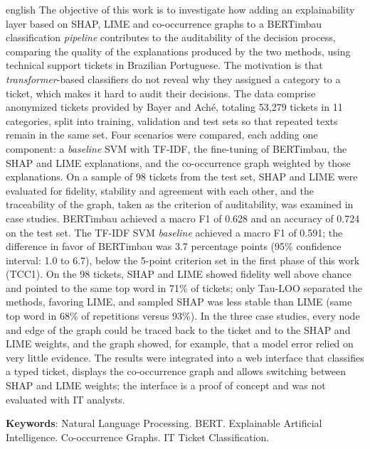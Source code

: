 \documentclass[
    12pt,                %
    openright,           %
    oneside,             %
    a4paper,             %
    english,             %
    brazil               %
]{abntex2}
\begin{document}
\begin{resumo}[Abstract]
\begin{otherlanguage*}{english}
The objective of this work is to investigate how adding an explainability layer based on SHAP, LIME and co-occurrence graphs to a BERTimbau classification \textit{pipeline} contributes to the auditability of the decision process, comparing the quality of the explanations produced by the two methods, using technical support tickets in Brazilian Portuguese. The motivation is that \textit{transformer}-based classifiers do not reveal why they assigned a category to a ticket, which makes it hard to audit their decisions. The data comprise anonymized tickets provided by Bayer and Aché, totaling 53,279 tickets in 11 categories, split into training, validation and test sets so that repeated texts remain in the same set. Four scenarios were compared, each adding one component: a \textit{baseline} SVM with TF-IDF, the fine-tuning of BERTimbau, the SHAP and LIME explanations, and the co-occurrence graph weighted by those explanations. On a sample of 98 tickets from the test set, SHAP and LIME were evaluated for fidelity, stability and agreement with each other, and the traceability of the graph, taken as the criterion of auditability, was examined in case studies. BERTimbau achieved a macro F1 of 0.628 and an accuracy of 0.724 on the test set. The TF-IDF SVM \textit{baseline} achieved a macro F1 of 0.591; the difference in favor of BERTimbau was 3.7 percentage points (95\% confidence interval: 1.0 to 6.7), below the 5-point criterion set in the first phase of this work (TCC1).
On the 98 tickets, SHAP and LIME showed fidelity well above chance and pointed to the same top word in 71\% of tickets; only Tau-LOO separated the methods, favoring LIME, and sampled SHAP was less stable than LIME (same top word in 68\% of repetitions versus 93\%).
In the three case studies, every node and edge of the graph could be traced back to the ticket and to the SHAP and LIME weights, and the graph showed, for example, that a model error relied on very little evidence.
The results were integrated into a web interface that classifies a typed ticket, displays the co-occurrence graph and allows switching between SHAP and LIME weights; the interface is a proof of concept and was not evaluated with IT analysts.

\vspace{\onelineskip}

\noindent
\textbf{Keywords}: Natural Language Processing. BERT. Explainable Artificial Intelligence. Co-occurrence Graphs. IT Ticket Classification.
\end{otherlanguage*}
\end{resumo}
\end{document}
